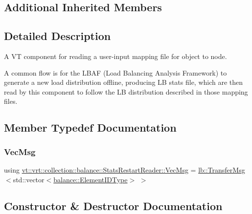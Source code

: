 \subsection*{Additional Inherited Members}


\subsection{Detailed Description}
A VT component for reading a user-\/input mapping file for object to node. 

A common flow is for the L\+B\+AF (Load Balancing Analysis Framework) to generate a new load distribution offline, producing LB stats file, which are then read by this component to follow the LB distribution described in those mapping files. 

\subsection{Member Typedef Documentation}
\mbox{\label{structvt_1_1vrt_1_1collection_1_1balance_1_1_stats_restart_reader_a7e2a74977e595242bf3abb6c83b7e27b}} 
\subsubsection{\texorpdfstring{Vec\+Msg}{VecMsg}}
{\footnotesize\ttfamily using \hyperlink{structvt_1_1vrt_1_1collection_1_1balance_1_1_stats_restart_reader_a7e2a74977e595242bf3abb6c83b7e27b}{vt\+::vrt\+::collection\+::balance\+::\+Stats\+Restart\+Reader\+::\+Vec\+Msg} =  \hyperlink{structvt_1_1vrt_1_1collection_1_1lb_1_1_transfer_msg}{lb\+::\+Transfer\+Msg}$<$std\+::vector$<$\hyperlink{namespacevt_1_1vrt_1_1collection_1_1balance_a592736f733df4f90856df90a1fd08905}{balance\+::\+Element\+I\+D\+Type}$>$ $>$}



\subsection{Constructor \& Destructor Documentation}
\mbox{\label{structvt_1_1vrt_1_1collection_1_1balance_1_1_stats_restart_reader_a6813a4a484008c90cc12fb384e20f8c1}} 
